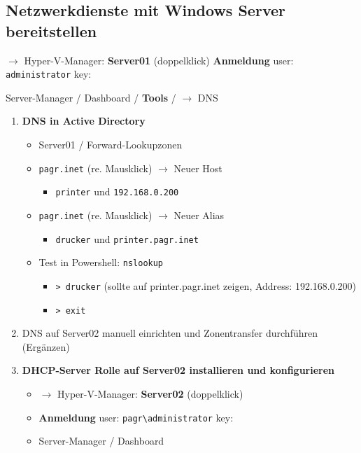 \subsection{Netzwerkdienste mit Windows Server
bereitstellen}\label{netzwerkdienste-mit-windows-server-bereitstellen}

$\to$ Hyper-V-Manager: \textbf{Server01} (doppelklick)
\textbf{Anmeldung} user: \verb|administrator| key:

Server-Manager / Dashboard / \textbf{Tools} / $\to$ DNS

\begin{enumerate}
\item
  \textbf{DNS in Active Directory}

  \begin{itemize}
  \item
    Server01 / Forward-Lookupzonen
  \item
    \verb|pagr.inet| (re. Mausklick) $\to$ Neuer
    Host

    \begin{itemize}
    \item
      \verb|printer| und
      \verb|192.168.0.200|
    \end{itemize}
  \item
    \verb|pagr.inet| (re. Mausklick) $\to$ Neuer
    Alias

    \begin{itemize}
    \item
      \verb|drucker| und
      \verb|printer.pagr.inet|
    \end{itemize}
  \item
    Test in Powershell: \verb|nslookup|

    \begin{itemize}
    \item
      \verb|> drucker| (sollte auf printer.pagr.inet
      zeigen, Address: 192.168.0.200)
    \item
      \verb|> exit|
    \end{itemize}
  \end{itemize}
\item
  DNS auf Server02 manuell einrichten und Zonentransfer durchführen
  (Ergänzen)
\item
  \textbf{DHCP-Server Rolle auf Server02 installieren und konfigurieren}

  \begin{itemize}
  \item
    $\to$ Hyper-V-Manager: \textbf{Server02} (doppelklick)
  \item
    \textbf{Anmeldung} user:
    \verb|pagr\administrator| key:
  \item
    Server-Manager / Dashboard


\end{itemize}
\end{enumerate}
